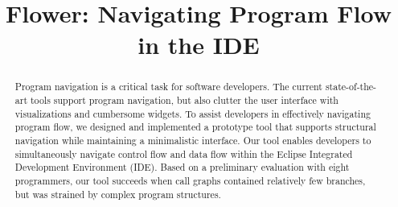 \documentclass[conference]{IEEEtran}
\begin{document}
%
\title{Flower: Navigating Program Flow in the IDE}


\author{
	}


\maketitle

\begin{abstract}
Program navigation is a critical task for software developers. 
The current state-of-the-art tools support program navigation, but also clutter the user interface with visualizations and cumbersome widgets.
To assist developers in effectively navigating program flow, we designed and implemented a prototype tool that supports structural navigation while maintaining a minimalistic interface.
Our tool enables developers to simultaneously navigate control flow and data flow within the Eclipse Integrated Development Environment (IDE).
Based on a preliminary evaluation with eight programmers, our tool succeeds when call graphs contained relatively few branches, but was strained by complex program structures. 
\end{abstract}
\end{document}
